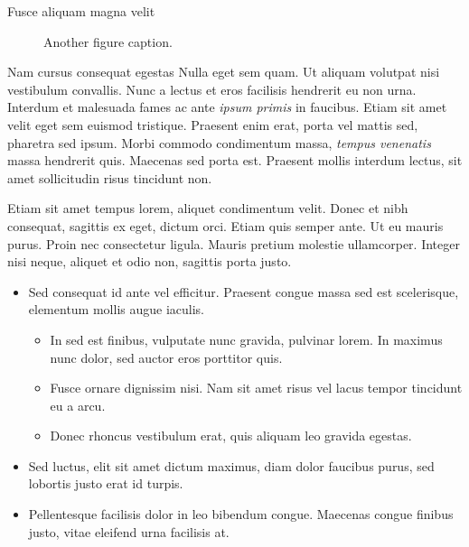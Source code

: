 \documentclass[final]{beamer}
\newlength{\colwidth}
\begin{document}
\begin{frame}[label={sec:orgc24fd89}]{}
\begin{block}{}
\begin{columns}
\begin{column}{\colwidth\columnwidth}
\begin{block}{Fusce aliquam magna velit}
\begin{figure}
  \centering
  \caption{Another figure caption.}
\end{figure}
\end{block}

\begin{block}{Nam cursus consequat egestas}
Nulla eget sem quam. Ut aliquam volutpat nisi vestibulum convallis. Nunc a
lectus et eros facilisis hendrerit eu non urna. Interdum et malesuada fames ac
ante \emph{ipsum primis} in faucibus. Etiam sit amet velit eget sem euismod
tristique. Praesent enim erat, porta vel mattis sed, pharetra sed ipsum. Morbi
commodo condimentum massa, \emph{tempus venenatis} massa hendrerit quis. Maecenas sed
porta est. Praesent mollis interdum lectus, sit amet sollicitudin risus
tincidunt non.

Etiam sit amet tempus lorem, aliquet condimentum velit. Donec et nibh consequat,
sagittis ex eget, dictum orci. Etiam quis semper ante. Ut eu mauris purus. Proin
nec consectetur ligula. Mauris pretium molestie ullamcorper. Integer nisi neque,
aliquet et odio non, sagittis porta justo.

\begin{itemize}
\item \alert{Sed consequat} id ante vel efficitur. Praesent congue massa sed est
scelerisque, elementum mollis augue iaculis.
\begin{itemize}
\item In sed est finibus, vulputate nunc gravida, pulvinar lorem. In maximus nunc
dolor, sed auctor eros porttitor quis.
\item Fusce ornare dignissim nisi.  Nam sit amet risus vel lacus tempor tincidunt
eu a arcu.
\item Donec rhoncus vestibulum erat, quis aliquam leo gravida egestas.
\end{itemize}
\item \alert{Sed luctus, elit sit amet} dictum maximus, diam dolor faucibus purus, sed
lobortis justo erat id turpis.
\item \alert{Pellentesque facilisis dolor in leo} bibendum congue.  Maecenas congue
finibus justo, vitae eleifend urna facilisis at.
\end{itemize}


\end{block}
\end{column}
\end{columns}
\end{block}
\end{frame}
\end{document}
